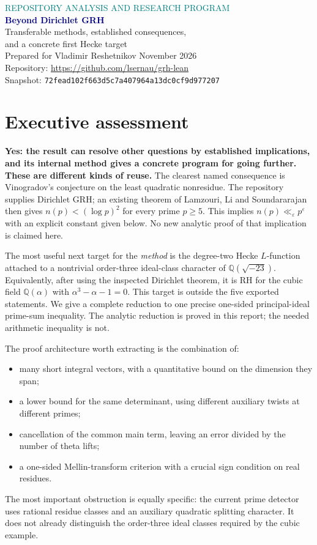 \documentclass[11pt,letterpaper]{article}
\theoremstyle{definition}\newtheorem{definition}[theorem]{Definition}
\theoremstyle{remark}\newtheorem{remark}[theorem]{Remark}
\newcommand{\Q}{\mathbb Q}\newcommand{\R}{\mathbb R}\newcommand{\C}{\mathbb C}
\newcommand{\sha}{72fead102f663d5c7a407964a13dc0cf9d977207}
\begin{document}
\begin{center}
{\small\textcolor{teal}{REPOSITORY ANALYSIS AND RESEARCH PROGRAM}}\\[8pt]
{\LARGE\bfseries\textcolor{navy}{Beyond Dirichlet GRH}}\\[6pt]
{\large Transferable methods, established consequences,\\
and a concrete first Hecke target}\\[12pt]
{Prepared for Vladimir Reshetnikov}\quad\textbar{} November 2026\\[6pt]
{\small Repository: \url{https://github.com/lsernau/grh-lean}}\\
{\footnotesize Snapshot: \texttt{\sha}}
\end{center}

\section*{Executive assessment}
\textbf{Yes: the result can resolve other questions by established implications, and its
internal method gives a concrete program for going further. These are different kinds of reuse.}
The clearest named consequence is Vinogradov's conjecture on the least quadratic nonresidue.
The repository supplies Dirichlet GRH; an existing theorem of Lamzouri, Li and Soundararajan
then gives $n(p)<(\log p)^2$ for every prime $p\ge5$. This implies
$n(p)\ll_\varepsilon p^\varepsilon$ with an explicit constant given below.
No new analytic proof of that implication is claimed here.

The most useful next target for the \emph{method} is the degree-two Hecke $L$-function attached
to a nontrivial order-three ideal-class character of $\Q(\sqrt{-23})$. Equivalently, after using
the inspected Dirichlet theorem, it is RH for the cubic field
$\Q(\alpha)$ with $\alpha^3-\alpha-1=0$. This target is outside the five exported statements.
We give a complete reduction to one precise one-sided principal-ideal prime-sum inequality.
The analytic reduction is proved in this report; the needed arithmetic inequality is not.

The proof architecture worth extracting is the combination of:
\begin{itemize}
\item many short integral vectors, with a quantitative bound on the dimension they span;
\item a lower bound for the same determinant, using different auxiliary twists at different primes;
\item cancellation of the common main term, leaving an error divided by the number of theta lifts;
\item a one-sided Mellin-transform criterion with a crucial sign condition on real residues.
\end{itemize}
The most important obstruction is equally specific: the current prime detector uses rational
residue classes and an auxiliary quadratic splitting character. It does not already distinguish
the order-three ideal classes required by the cubic example.
\end{document}
